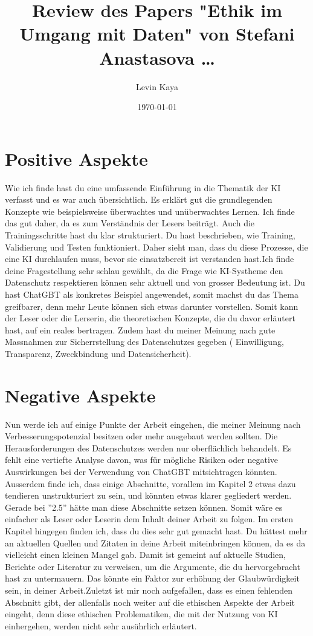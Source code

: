 \documentclass{article}
\title{Review des Papers "Ethik im Umgang mit Daten" von Stefani Anastasova \dots}
\author{Levin Kaya}
\date{\today}
\begin{document}
\maketitle



\section{Positive Aspekte}
 Wie ich finde hast du eine umfassende Einführung in die Thematik der KI verfasst und es war auch übersichtlich. Es erklärt gut die grundlegenden Konzepte wie beispielsweise überwachtes und unüberwachtes Lernen. Ich finde das gut daher, da es zum Verständnis der Lesers beiträgt.
Auch die Trainingsschritte hast du klar strukturiert. Du hast beschrieben, wie Training, Validierung und Testen funktioniert. Daher sieht man, dass du diese Prozesse, die eine KI durchlaufen muss, bevor sie einsatzbereit ist verstanden hast.Ich finde deine Fragestellung sehr schlau gewählt, da die Frage wie KI-Systheme den Datenschutz respektieren können sehr aktuell und von grosser Bedeutung ist. Du hast ChatGBT als konkretes Beispiel angewendet, somit machst du das Thema greifbarer, denn mehr Leute können sich etwas darunter vorstellen. Somit kann der Leser oder die Lerserin, die theoretischen Konzepte, die du davor erläutert hast, auf ein reales bertragen. Zudem hast du meiner Meinung nach gute Massnahmen zur Sicherrstellung des Datenschutzes gegeben ( Einwilligung, Transparenz, Zweckbindung und Datensicherheit). 



\section{Negative Aspekte}


Nun werde ich auf einige Punkte der Arbeit eingehen, die meiner Meinung nach Verbesserungspotenzial besitzen oder mehr ausgebaut werden sollten. Die Herausforderungen des Datenschutzes werden nur oberflächlich behandelt. Es fehlt eine vertiefte Analyse davon, was für mögliche Risiken oder negative Auswirkungen bei der Verwendung von ChatGBT mitsichtragen könnten. Ausserdem finde ich, dass einige Abschnitte, vorallem im Kapitel 2 etwas dazu tendieren unstrukturiert zu sein, und könnten etwas klarer gegliedert werden. Gerade bei ''2.5'' hätte man diese Abschnitte setzen können. Somit wäre es einfacher als Leser oder Leserin dem Inhalt deiner Arbeit zu folgen. Im ersten Kapitel hingegen finden ich, dass du dies sehr gut gemacht hast. Du hättest mehr an aktuellen Quellen und Zitaten in deine Arbeit miteinbringen können, da es da vielleicht einen kleinen Mangel gab. Damit ist gemeint auf aktuelle Studien, Berichte oder Literatur zu verweisen, um die Argumente, die du hervorgebracht hast zu untermauern. Das könnte ein Faktor  zur erhöhung der Glaubwürdigkeit sein, in deiner Arbeit.Zuletzt ist mir noch aufgefallen, dass es einen fehlenden Abschnitt gibt, der allenfalls noch weiter auf die ethischen Aspekte der Arbeit eingeht, denn diese ethischen Problematiken, die mit der Nutzung von KI einhergehen, werden nicht sehr ausührlich erläutert. 
\end{document}
